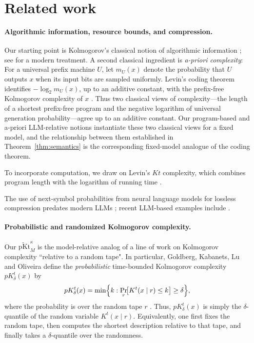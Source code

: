 \documentclass[letterpaper]{article} %
\theoremstyle{definition}
\theoremstyle{remark}
\newcommand{\pKt}{\mathrm{pKt}}
\newcommand{\pKtt}{\widetilde{\pKt}}
\begin{document}
\section{Related work}\label{sec:related}

\paragraph{Algorithmic information, resource bounds, and compression.}
Our starting point is Kolmogorov's classical notion of algorithmic information
\cite{Kolmogorov65,ZL70}; see \cite{LiVitanyi} for a modern treatment. A
second classical ingredient is \emph{a-priori complexity}: For a universal
prefix machine \(U\), let \(m_U(x)\) denote the probability that \(U\) outputs
\(x\) when its input bits are sampled uniformly. Levin's coding theorem
identifies \(-\log_2m_U(x)\), up to an additive constant, with the prefix-free
Kolmogorov complexity of \(x\) \cite{ZL70,LiVitanyi}. Thus two classical views
of complexity---the length of a shortest prefix-free program and the negative
logarithm of universal generation probability---agree up to an additive
constant. 
Our program-based and a-priori LLM-relative notions instantiate these two
classical views for a fixed model, and the relationship between them established
in Theorem~\ref{thm:semantics} is the corresponding fixed-model analogue of
the coding theorem.


To incorporate computation, we draw on Levin's \(Kt\) complexity, which
combines program length with the logarithm of running time
\cite{Levin73}. 

The use of next-symbol probabilities from neural language models for lossless
compression predates modern LLMs \cite{SchmidhuberHeil96}; recent LLM-based
examples include \cite{Valmeekam23,Deletang24}.

\paragraph{Probabilistic and randomized Kolmogorov complexity.}
Our $\pKtt^{\kappa}_M$ is the model-relative analog of a line of work on
Kolmogorov complexity ``relative to a random tape". In particular, Goldberg, Kabanets, Lu and
Oliveira define the \emph{probabilistic} time-bounded Kolmogorov complexity
$pK^t_\delta(x)$ by
\[
pK^t_\delta(x)
=
\min\Bigl\{
k :
\Pr_r\!\bigl[K^t(x\mid r)\le k\bigr]\ge \delta
\Bigr\},
\]
where the probability is over the random tape $r$ \cite{GKLO22}. Thus,
$pK^t_\delta(x)$ is simply the $\delta$-quantile of the random variable
$K^t(x\mid r)$.
Equivalently, one first fixes the random tape, then computes the shortest
description relative to that tape, and finally takes a $\delta$-quantile over the
randomness.
\end{document}
